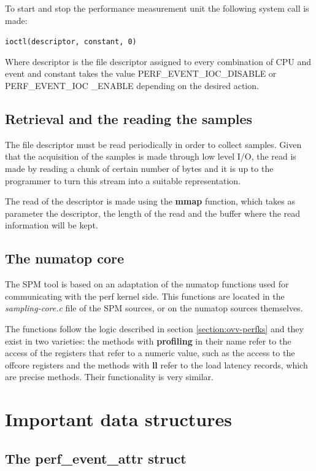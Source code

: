 To start and stop the performance measurement unit the following system call is made: 
\\
\begin{center}
\texttt{ioctl(descriptor, constant, 0)}
\end{center}
Where descriptor is the file descriptor assigned to every combination of CPU and event and constant takes the value PERF\_EVENT\_IOC\_DISABLE or PERF\_EVENT\_IOC \_ENABLE depending on the desired action.


\subsection{Retrieval and the reading the samples}\label{section:retr-reaf}

The file descriptor must be read periodically in order to collect samples. Given that the acquisition of the samples is made through low level I/O, the read is made by reading a chunk of certain number of bytes and it is up to the programmer to turn this stream into a suitable representation. 

The read of the descriptor is made using the \textbf{mmap} function, which takes as parameter the descriptor, the length of the read and the buffer where the read information will be kept.

\subsection{The numatop core}\label{section:numatop-core}
The SPM tool is based on an adaptation of the numatop functions used for communicating with the perf kernel side. This functions are located in the \textit{sampling-core.c} file of the SPM sources, or on the numatop sources themselves.

The functions follow the logic described in section \ref{section:ovv-perfks} and they exist in two varieties: the methods with \textbf{profiling} in their name refer to the access of the registers that refer to a numeric value, such as the access to the offcore registers and the methods with \textbf{ll} refer to the load latency records, which are precise methods. Their functionality is very similar. 

\section{Important data structures}\label{section:important-structs}

\subsection{The perf\_event\_attr struct}\label{section:pea-stru}

